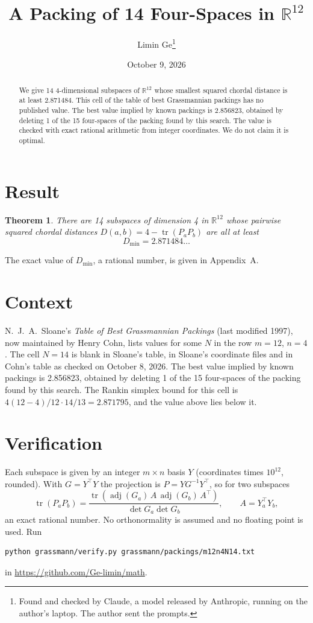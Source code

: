 \documentclass[11pt,a4paper]{article}
\title{A Packing of 14 Four-Spaces in $\mathbb{R}^{12}$}
\author{Limin Ge\thanks{Found and checked by Claude, a model released by Anthropic, running on the author's laptop. The author sent the prompts.}}
\date{October 9, 2026}
\newtheorem*{theorem}{Theorem}
\begin{document}
\maketitle
\begin{abstract}
We give 14 4-dimensional subspaces of $\mathbb{R}^{12}$ whose smallest squared chordal distance is at least 2.871484. This cell of the table of best Grassmannian packings has no published value. The best value implied by known packings is 2.856823, obtained by deleting 1 of the 15 four-spaces of the packing found by this search. The value is checked with exact rational arithmetic from integer coordinates. We do not claim it is optimal.
\end{abstract}

\section{Result}
\begin{theorem}
There are 14 subspaces of dimension 4 in $\mathbb{R}^{12}$ whose pairwise squared chordal distances $D(a,b) = 4 - \operatorname{tr}(P_aP_b)$ are all at least
\[ D_{\min} = 2.871484\ldots \]
\end{theorem}
The exact value of $D_{\min}$, a rational number, is given in Appendix~A.


\section{Context}
N.~J.~A.~Sloane's \emph{Table of Best Grassmannian Packings} (last modified 1997), now maintained by Henry Cohn, lists values for some $N$ in the row $m=12$, $n=4$. The cell $N=14$ is blank in Sloane's table, in Sloane's coordinate files and in Cohn's table as checked on October 8, 2026. The best value implied by known packings is 2.856823, obtained by deleting 1 of the 15 four-spaces of the packing found by this search. The Rankin simplex bound for this cell is $4(12-4)/12\cdot 14/13 = 2.871795$, and the value above lies below it.


\section{Verification}
Each subspace is given by an integer $m\times n$ basis $Y$ (coordinates times $10^{12}$, rounded). With $G=Y^\top Y$ the projection is $P=YG^{-1}Y^\top$, so for two subspaces
\[ \operatorname{tr}(P_aP_b)=\frac{\operatorname{tr}(\operatorname{adj}(G_a)\,A\,\operatorname{adj}(G_b)\,A^\top)}{\det G_a\det G_b},\qquad A=Y_a^\top Y_b, \]
an exact rational number. No orthonormality is assumed and no floating point is used. Run
\begin{verbatim}
python grassmann/verify.py grassmann/packings/m12n4N14.txt
\end{verbatim}
in \url{https://github.com/Ge-limin/math}.
\end{document}
